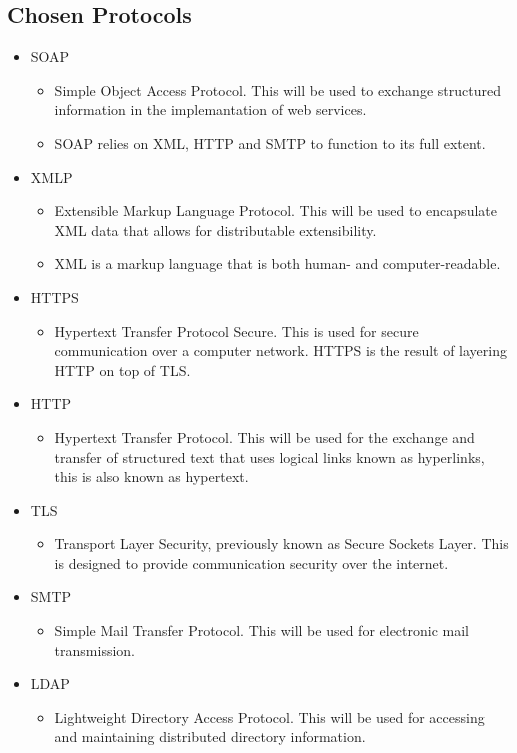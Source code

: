 \documentclass[12pt,a4paper]{article}
\begin{document}
\subsection{Chosen Protocols}
\begin{itemize}
	\item SOAP
		\begin{itemize}
			\item Simple Object Access Protocol. This will be used to exchange structured information in the implemantation of web services.
			\item SOAP relies on XML, HTTP and SMTP to function to its full extent.
		\end{itemize}
	\item XMLP
		\begin{itemize}
			\item Extensible Markup Language Protocol. This will be used to encapsulate XML data that allows for distributable extensibility.
			\item XML is a markup language that is both human- and computer-readable.
		\end{itemize}
	\item HTTPS
		\begin{itemize}
			\item Hypertext Transfer Protocol Secure. This is used for secure communication over a computer network. HTTPS is the result of layering HTTP on top of TLS.
		\end{itemize}
	\item HTTP
		\begin{itemize}
			\item Hypertext Transfer Protocol. This will be used for the exchange and transfer of structured text that uses logical links known as hyperlinks, this is also known as hypertext.
		\end{itemize}
	\item TLS
		\begin{itemize}
			\item Transport Layer Security, previously known as Secure Sockets Layer. This is designed to provide communication security over the internet.
		\end{itemize}
	\item SMTP
		\begin{itemize}
			\item Simple Mail Transfer Protocol. This will be used for electronic mail transmission.
		\end{itemize}
	\item LDAP
		\begin{itemize}
			\item Lightweight Directory Access Protocol. This will be used for accessing and maintaining distributed directory information.
		\end{itemize}
\end{itemize}
\end{document}
